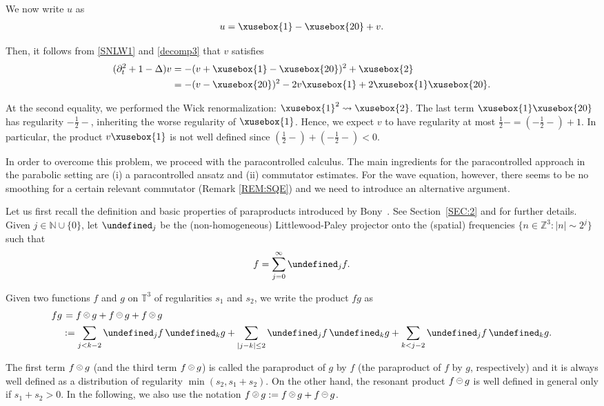 \documentclass[%
11pt,  reqno]{amsart}
\def\<#1>{\xusebox{#1}}
\newcommand{\pe}{\mathbin{\scaleobj{0.7}{\tikz \draw (0,0) node[shape=circle,draw,inner sep=0pt,minimum size=8.5pt] {\scriptsize  $=$};}}}
\newcommand{\pl}{\mathbin{\scaleobj{0.7}{\tikz \draw (0,0) node[shape=circle,draw,inner sep=0pt,minimum size=8.5pt] {\scriptsize $<$};}}}
\newcommand{\pg}{\mathbin{\scaleobj{0.7}{\tikz \draw (0,0) node[shape=circle,draw,inner sep=0pt,minimum size=8.5pt] {\scriptsize $>$};}}}
\newcommand{\pge}{\mathbin{\scaleobj{0.7}{\tikz \draw (0,0) node[shape=circle,draw,inner sep=0pt,minimum size=8.5pt] {\scriptsize $\geqslant$};}}}
\newcommand{\1}{\hspace{0.2mm}\text{I}\hspace{0.2mm}}
\newcommand{\noi}{\noindent}
\newcommand{\Z}{\mathbb{Z}}
\newcommand{\T}{\mathbb{T}}
\let\P= \undefined
\newcommand{\P}{\mathbf{P}}
\newcommand{\Dl}{\Delta}
\newcommand{\dt}{\partial_t}
\newcommand{\N}{\mathbb{N}}
\numberwithin{equation}{section}
\numberwithin{theorem}{section}
\begin{document}
We now write $u$ as 
\begin{align}
u = \<1> - \<20> + v.
\label{decomp3}
\end{align}




\noi
Then, it follows from \eqref{SNLW1} and \eqref{decomp3} that $v$ satisfies
\begin{align*}
(\dt^2  +1 -  \Dl)  v 
&  =  - (v + \<1> - \<20>)^2 + \<2>\notag \\
& = -  (v  - \<20>)^2 -2 v \<1> + 2 \<1>\<20>.
\end{align*}

\noi
At the second equality,  we performed the Wick renormalization: $\<1>^2 \rightsquigarrow \<2>$.
The last term  $\<1>\<20>$ 
has regularity $-\frac 12 -$, inheriting the worse regularity of $\<1>$.
Hence, we expect $v$ to have regularity at most $\frac 12- = (-\frac 12-) + 1$.
In particular, the product 
$v \<1>$ is not well defined since $(\frac 12-) + (-\frac 12-) < 0$.




In order to overcome this problem, 
we proceed with the paracontrolled calculus.
The main ingredients for the paracontrolled approach in the parabolic setting
are (i) a paracontrolled ansatz 
and (ii) commutator estimates.
For the wave equation, however, 
there seems to be no smoothing for a certain relevant commutator
(Remark \ref{REM:SQE})
and we need to introduce an alternative argument. 

Let us first recall
 the definition and basic properties of  paraproducts
 introduced by Bony~\cite{Bony}.
 See Section~\ref{SEC:2} and \cite{BCD, GIP} for further details.
Given $j \in \N\cup\{0\}$,  let $\P_{j}$
 be the (non-homogeneous) Littlewood-Paley projector
 onto the (spatial) frequencies $\{n \in \Z^3: |n|\sim 2^j\}$
 such that 
 \[ f = \sum_{j = 0}^\infty \P_jf.\]
 
 \noi
Given two functions $f$ and $g$ on $\T^3$
of regularities $s_1$ and $s_2$, 
we write the product $fg$ as
\begin{align}
fg & \hspace*{0.3mm}
= f\pl g + f \pe g + f \pg g\notag \\
& := \sum_{j < k-2} \P_{j} f \, \P_k g
+ \sum_{|j - k|  \leq 2} \P_{j} f\,  \P_k g
+ \sum_{k < j-2} \P_{j} f\,  \P_k g.
\label{para1}
\end{align}

\noi
The first term 
$f\pl g$ (and the third term $f\pg g$) is called the paraproduct of $g$ by $f$
(the paraproduct of $f$ by $g$, respectively)
and it is always well defined as a distribution
of regularity $\min(s_2, s_1+ s_2)$.
On the other hand, 
the resonant product $f \pe g$ is well defined in general 
only if $s_1 + s_2 > 0$.
In the following, we also use the notation $f\pge g := f\pg g + f\pe g$.
\end{document}
